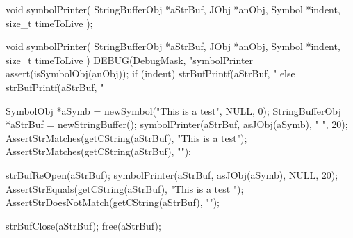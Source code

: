\startTestSuite[symbolPrinter]

\startCHeader
void symbolPrinter(
  StringBufferObj *aStrBuf,
  JObj            *anObj,
  Symbol          *indent,
  size_t           timeToLive
);
\stopCHeader

\startCCode
void symbolPrinter(
  StringBufferObj *aStrBuf,
  JObj            *anObj,
  Symbol          *indent,
  size_t           timeToLive
) {
  DEBUG(DebugMask, "symbolPrinter %
  assert(isSymbolObj(anObj));
  if (indent) {
    strBufPrintf(aStrBuf, "%
  } else {
    strBufPrintf(aStrBuf, "%
  }
}
\stopCCode


\startCTest
  SymbolObj *aSymb = newSymbol("This is a test", NULL, 0);
  StringBufferObj *aStrBuf = newStringBuffer();
  symbolPrinter(aStrBuf, asJObj(aSymb), "  ", 20);
  AssertStrMatches(getCString(aStrBuf), "This is a test");
  AssertStrMatches(getCString(aStrBuf), "\n");
  
  strBufReOpen(aStrBuf);
  symbolPrinter(aStrBuf, asJObj(aSymb), NULL, 20);
  AssertStrEquals(getCString(aStrBuf), "This is a test ");
  AssertStrDoesNotMatch(getCString(aStrBuf), "\n");
  
  strBufClose(aStrBuf);
  free(aStrBuf);
\stopCTest

\stopTestCase
\stopTestSuite